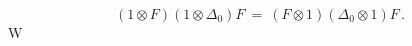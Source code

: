 \begin{equation}(1\otimes F) ( 1\otimes \Delta_0 ) F \
= \ ( F\otimes 1) ( \Delta_0\otimes 1 ) F\,
.\label{r352}\end{equation}W
